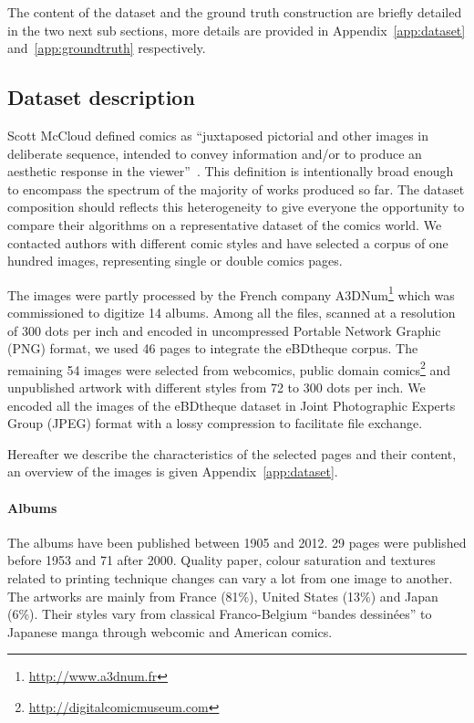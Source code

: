 The content of the dataset and the ground truth construction are briefly detailed in the two next sub sections, more details are provided in Appendix~\ref{app:dataset} and~\ref{app:groundtruth} respectively.



\subsection{Dataset description} %
\label{sec:dataset_description}


Scott McCloud defined comics as ``juxtaposed pictorial and other images in deliberate sequence, intended to convey information and/or to produce an aesthetic response in the viewer''~\cite{mccloud1994understanding}.
This definition is intentionally broad enough to encompass the spectrum of the majority of works produced so far.
The dataset composition should reflects this heterogeneity to give everyone the opportunity
to compare their algorithms on a representative dataset of the comics world.
We contacted authors with different comic styles and have selected a corpus of one hundred images, representing single or double comics pages.

The images were partly processed by the French company A3DNum\footnote{\url{http://www.a3dnum.fr}} which was commissioned to digitize 14 albums.
Among all the files, scanned at a resolution of 300 dots per inch and encoded in uncompressed Portable Network Graphic (PNG) format, we used 46 pages to integrate the eBDtheque corpus.
The remaining 54 images were selected from webcomics, public domain comics\footnote{\url{http://digitalcomicmuseum.com}} and unpublished artwork with different styles from 72 to 300 dots per inch.
We encoded all the images of the eBDtheque dataset in Joint Photographic Experts Group (JPEG) format with a lossy compression to facilitate file exchange.

Hereafter we describe the characteristics of the selected pages and their content, an overview of the images is given Appendix~\ref{app:dataset}.

\paragraph{Albums} %
 \label{par:albums}
 The albums have been published between 1905 and 2012.
 29 pages were published before 1953 and 71 after 2000.
 Quality paper, colour saturation and textures related to printing technique changes can vary a lot from one image to another.
 The artworks are mainly from France (81\%), United States (13\%) and Japan (6\%).
 Their styles vary from classical Franco-Belgium ``bandes dessinées'' to Japanese manga through webcomic and American comics.

